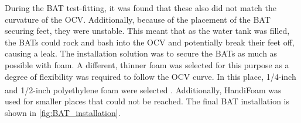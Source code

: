 \par
During the BAT test-fitting, it was found that these also did not match the curvature of the OCV.
Additionally, because of the placement of the BAT securing feet, they were unstable.
This meant that as the water tank was filled, the BATs could rock and bash into the OCV and potentially break their feet off, causing a leak.
The installation solution was to secure the BATs as much as possible with foam.
A different, thinner foam was selected for this purpose as a degree of flexibility was required to follow the OCV curve.
In this place, 1/4-inch and 1/2-inch polyethylene foam were selected \cite{white_foam_ref}.
Additionally, HandiFoam\textsuperscript{\textregistered} was used for smaller places that could not be reached.
The final BAT installation is shown in \autoref{fig:BAT_installation}.

